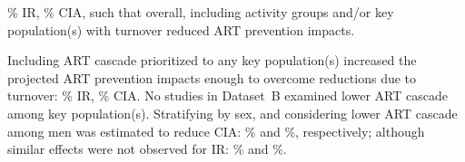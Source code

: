 \% IR, \% CIA,
such that overall, including activity groups and/or key population(s) with turnover
reduced ART prevention impacts.
\par
Including ART cascade prioritized to any key population(s)
increased the projected ART prevention impacts enough to overcome reductions due to turnover:
\% IR, \% CIA.
No studies in Dataset~B examined lower ART cascade among key population(s).
Stratifying by sex, and considering lower ART cascade among men was estimated to reduce CIA:
\% and \%, respectively;
although similar effects were not observed for IR:
\% and \%.